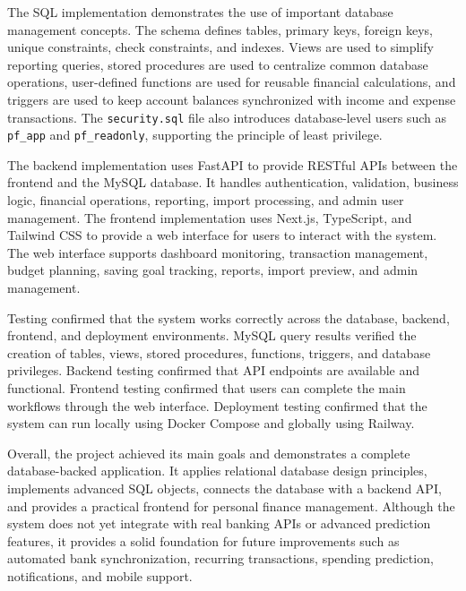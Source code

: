 \documentclass{article}
\begin{document}
The SQL implementation demonstrates the use of important database management concepts. The schema defines tables, primary keys, foreign keys, unique constraints, check constraints, and indexes. Views are used to simplify reporting queries, stored procedures are used to centralize common database operations, user-defined functions are used for reusable financial calculations, and triggers are used to keep account balances synchronized with income and expense transactions. The \texttt{security.sql} file also introduces database-level users such as \texttt{pf\_app} and \texttt{pf\_readonly}, supporting the principle of least privilege.

The backend implementation uses FastAPI to provide RESTful APIs between the frontend and the MySQL database. It handles authentication, validation, business logic, financial operations, reporting, import processing, and admin user management. The frontend implementation uses Next.js, TypeScript, and Tailwind CSS to provide a web interface for users to interact with the system. The web interface supports dashboard monitoring, transaction management, budget planning, saving goal tracking, reports, import preview, and admin management.

Testing confirmed that the system works correctly across the database, backend, frontend, and deployment environments. MySQL query results verified the creation of tables, views, stored procedures, functions, triggers, and database privileges. Backend testing confirmed that API endpoints are available and functional. Frontend testing confirmed that users can complete the main workflows through the web interface. Deployment testing confirmed that the system can run locally using Docker Compose and globally using Railway.

Overall, the project achieved its main goals and demonstrates a complete database-backed application. It applies relational database design principles, implements advanced SQL objects, connects the database with a backend API, and provides a practical frontend for personal finance management. Although the system does not yet integrate with real banking APIs or advanced prediction features, it provides a solid foundation for future improvements such as automated bank synchronization, recurring transactions, spending prediction, notifications, and mobile support.

\newpage
{}
\end{document}

